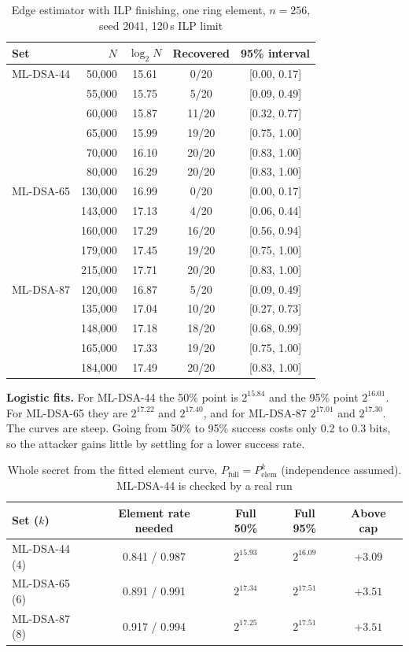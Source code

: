 \documentclass[10pt,conference,a4paper]{IEEEtran}
\begin{document}
\begin{table}[t]
\caption{Edge estimator with ILP finishing, one ring element, $n=256$, seed 2041, 120\,s ILP limit}\label{tab:counts}
\centering\footnotesize
\begin{tabular}{@{}lrccc@{}}
\toprule
Set & $N$ & $\log_2 N$ & Recovered & 95\% interval\\
\midrule
ML-DSA-44 & 50{,}000 & 15.61 & 0/20 & [0.00, 0.17]\\
 & 55{,}000 & 15.75 & 5/20 & [0.09, 0.49]\\
 & 60{,}000 & 15.87 & 11/20 & [0.32, 0.77]\\
 & 65{,}000 & 15.99 & 19/20 & [0.75, 1.00]\\
 & 70{,}000 & 16.10 & 20/20 & [0.83, 1.00]\\
 & 80{,}000 & 16.29 & 20/20 & [0.83, 1.00]\\
\midrule
ML-DSA-65 & 130{,}000 & 16.99 & 0/20 & [0.00, 0.17]\\
 & 143{,}000 & 17.13 & 4/20 & [0.06, 0.44]\\
 & 160{,}000 & 17.29 & 16/20 & [0.56, 0.94]\\
 & 179{,}000 & 17.45 & 19/20 & [0.75, 1.00]\\
 & 215{,}000 & 17.71 & 20/20 & [0.83, 1.00]\\
\midrule
ML-DSA-87 & 120{,}000 & 16.87 & 5/20 & [0.09, 0.49]\\
 & 135{,}000 & 17.04 & 10/20 & [0.27, 0.73]\\
 & 148{,}000 & 17.18 & 18/20 & [0.68, 0.99]\\
 & 165{,}000 & 17.33 & 19/20 & [0.75, 1.00]\\
 & 184{,}000 & 17.49 & 20/20 & [0.83, 1.00]\\
\bottomrule
\end{tabular}
\end{table}

\textbf{Logistic fits.} For ML-DSA-44 the 50\% point is $2^{15.84}$ and the 95\% point $2^{16.01}$. For ML-DSA-65 they are
$2^{17.22}$ and $2^{17.40}$, and for ML-DSA-87 $2^{17.01}$ and $2^{17.30}$. The curves are steep. Going from 50\% to 95\%
success costs only 0.2 to 0.3 bits, so the attacker gains little by settling for a lower success rate.

\begin{table}[t]
\caption{Whole secret from the fitted element curve, $P_\text{full}=P_\text{elem}^k$ (independence assumed). ML-DSA-44
is checked by a real run}\label{tab:fullsecret}
\centering\footnotesize
\begin{tabular}{@{}lcccc@{}}
\toprule
Set ($k$) & Element rate needed & Full 50\% & Full 95\% & Above cap\\
\midrule
ML-DSA-44 (4) & 0.841 / 0.987 & $2^{15.93}$ & $2^{16.09}$ & $+3.09$\\
ML-DSA-65 (6) & 0.891 / 0.991 & $2^{17.34}$ & $2^{17.51}$ & $+3.51$\\
ML-DSA-87 (8) & 0.917 / 0.994 & $2^{17.25}$ & $2^{17.51}$ & $+3.51$\\
\bottomrule
\end{tabular}
\end{table}
\end{document}
